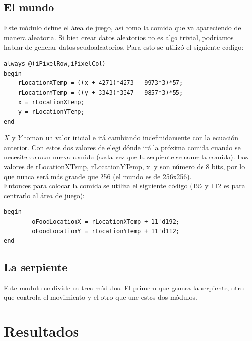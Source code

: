 \documentclass[10pt]{article}
\begin{document}
\subsection{El mundo}

Este módulo define el área de juego, así como la comida que va apareciendo de manera aleatoria. Si bien crear datos aleatorios no es algo trivial, podríamos hablar de generar datos seudoaleatorios. Para esto se utilizó el siguiente código:

\begin{lstlisting}
always @(iPixelRow,iPixelCol) 
begin		
	rLocationXTemp = ((x + 4271)*4273 - 9973*3)*57;
	rLocationYTemp = ((y + 3343)*3347 - 9857*3)*55;
	x = rLocationXTemp;
	y = rLocationYTemp;
end
\end{lstlisting}

$X$ y $Y$ toman un valor inicial e irá cambiando indefinidamente con la ecuación anterior. Con estos dos valores de elegi dónde irá la próxima comida cuando se necesite colocar nuevo comida (cada vez que la serpiente se come la comida). Los valores de rLocationXTemp, rLocationYTemp, x, y son número de 8 bits, por lo que nunca será más grande que 256 (el mundo es de 256x256).\\

Entonces para colocar la comida se utiliza el siguiente código (192 y 112 es para centrarlo al área de juego):

\begin{lstlisting}
begin
		oFoodLocationX = rLocationXTemp + 11'd192;
		oFoodLocationY = rLocationYTemp + 11'd112;
end
\end{lstlisting}

\subsection{La serpiente}

Este modulo se divide en tres módulos. El primero que genera la serpiente, otro que controla el movimiento y el otro que une estos dos módulos.

\section{Resultados}
\end{document}
